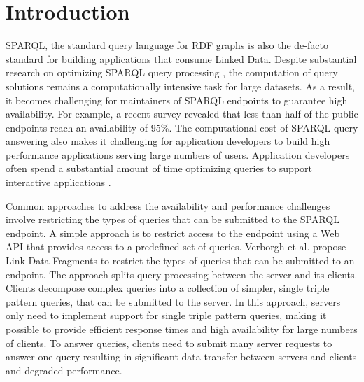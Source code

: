 \section{Introduction}
SPARQL, the standard query language for RDF graphs is also the de-facto standard for building applications that consume Linked Data. 
Despite substantial research on optimizing SPARQL query processing \cite{Pham2013}, the computation of query solutions remains a computationally intensive task for large datasets.
As a result, it becomes challenging for maintainers of SPARQL endpoints to guarantee high availability.
For example, a recent survey \cite{buil2013sparql} revealed that less than half of the public endpoints reach an availability of 95\%.
The computational cost of SPARQL query answering also makes it challenging for application developers to build high performance applications serving large numbers of users.
Application developers often spend a substantial amount of time optimizing queries to support interactive applications \cite{Loizou_Angles_Groth_2014}.

Common approaches to address the availability and performance challenges involve restricting the types of queries that can be submitted to the SPARQL endpoint.
A simple approach is to restrict access to the endpoint using a Web API \cite{Groth_Loizou_Gray_Goble_Harland_Pettifer_2014} that provides access to a predefined set of queries.
%
Verborgh et al. \cite{Verborgh2014} propose Link Data Fragments to restrict the types of queries that can be submitted to an endpoint. 
The approach splits query processing between the server and its clients.
Clients decompose complex queries into a collection of simpler, single triple pattern queries, that can be submitted to the server.
In this approach, servers only need to implement support for single triple pattern queries, making it possible to provide efficient response times and high availability for large numbers of clients.
To answer queries, clients need to submit many server requests to answer one query resulting in significant data transfer between servers and clients and degraded performance. 